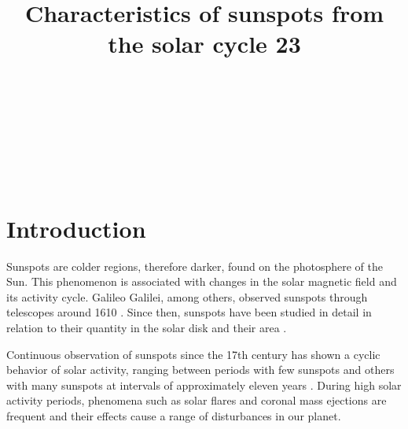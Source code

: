\documentclass[namedreferences]{solarphysics}
\begin{document}
\begin{article}
\begin{opening}

\title{Characteristics of sunspots from the solar cycle 23}

\author[addressref=aff1]{~}%
\author[addressref=aff2]{~}%
\author[addressref=aff3]{~}%
\author[addressref={aff1,aff2},corref,email={adrivalio@gmail.com}]{~}%

\address[id=aff1]{Centro de Rádio Astronomia e Astrofísica Mackenzie}
\address[id=aff2]{Escola de Engenharia Universidade Presbiteriana Mackenzie São Paulo Brazil}
\address[id=aff3]{Universidade Cruzeiro do Sul}


\begin{abstract}
\end{abstract}
\end{opening}

\section{Introduction}
     \label{S-Introduction} 
Sunspots are colder regions, therefore darker, found on the photosphere of the Sun.
This phenomenon is associated with changes in the solar magnetic field and its activity cycle.
Galileo Galilei, among others, observed sunspots through telescopes around 1610 \citep{Eddy1976}.
Since then, sunspots have been studied in detail in relation to their quantity in the solar disk and their area \citep{Hathaway2015}.

Continuous observation of sunspots since the 17th century has shown a cyclic behavior of solar activity,
ranging between periods with few sunspots and others with many sunspots at intervals of approximately eleven years \citep{Hathaway2015}.
During high solar activity periods, phenomena such as solar flares and coronal mass ejections are frequent and their effects cause a range of disturbances in our planet.


\end{article}
\end{document}
